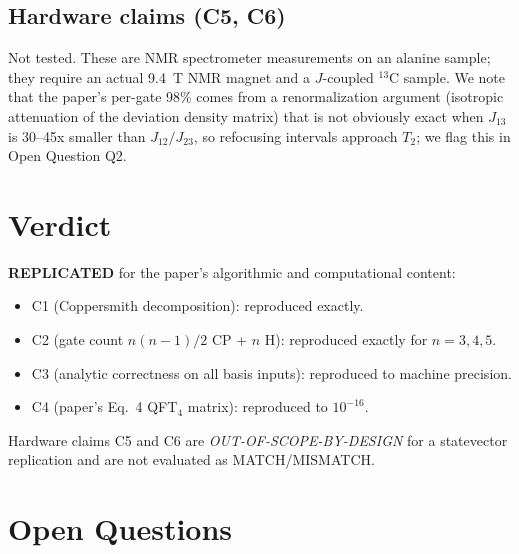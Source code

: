 \documentclass[11pt]{article}
\begin{document}
\subsection{Hardware claims (C5, C6)}
Not tested. These are NMR spectrometer measurements on an alanine
sample; they require an actual 9.4~T NMR magnet and a $J$-coupled
$^{13}$C sample. We note that the paper's per-gate 98\% comes from a
renormalization argument (isotropic attenuation of the deviation
density matrix) that is not obviously exact when $J_{13}$ is 30--45x
smaller than $J_{12}/J_{23}$, so refocusing intervals approach $T_2$;
we flag this in Open Question Q2.

\section{Verdict}

\textbf{REPLICATED} for the paper's algorithmic and computational
content:
\begin{itemize}
  \item C1 (Coppersmith decomposition): reproduced exactly.
  \item C2 (gate count $n(n-1)/2$ CP + $n$ H): reproduced exactly
        for $n=3,4,5$.
  \item C3 (analytic correctness on all basis inputs): reproduced to
        machine precision.
  \item C4 (paper's Eq.~4 QFT$_4$ matrix): reproduced to
        $10^{-16}$.
\end{itemize}
Hardware claims C5 and C6 are \emph{OUT-OF-SCOPE-BY-DESIGN} for a
statevector replication and are not evaluated as MATCH/MISMATCH.

\section{Open Questions}
\end{document}
